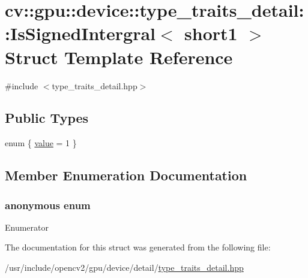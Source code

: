 \hypertarget{structcv_1_1gpu_1_1device_1_1type__traits__detail_1_1IsSignedIntergral_3_01short1_01_4}{\section{cv\-:\-:gpu\-:\-:device\-:\-:type\-\_\-traits\-\_\-detail\-:\-:Is\-Signed\-Intergral$<$ short1 $>$ Struct Template Reference}
\label{structcv_1_1gpu_1_1device_1_1type__traits__detail_1_1IsSignedIntergral_3_01short1_01_4}
}


{\ttfamily \#include $<$type\-\_\-traits\-\_\-detail.\-hpp$>$}

\subsection*{Public Types}
\begin{DoxyCompactItemize}
\item 
enum \{ \hyperlink{structcv_1_1gpu_1_1device_1_1type__traits__detail_1_1IsSignedIntergral_3_01short1_01_4_a915a71a38a582f613da7e56923549408a50918a03e2f43599201b97a733302d57}{value} = 1
 \}
\end{DoxyCompactItemize}


\subsection{Member Enumeration Documentation}
\hypertarget{structcv_1_1gpu_1_1device_1_1type__traits__detail_1_1IsSignedIntergral_3_01short1_01_4_a915a71a38a582f613da7e56923549408}{\subsubsection[{anonymous enum}]{\setlength{\rightskip}{0pt plus 5cm}anonymous enum}}\label{structcv_1_1gpu_1_1device_1_1type__traits__detail_1_1IsSignedIntergral_3_01short1_01_4_a915a71a38a582f613da7e56923549408}
\begin{Desc}
\item[Enumerator]\par
\begin{description}
\item[{\em 
\hypertarget{structcv_1_1gpu_1_1device_1_1type__traits__detail_1_1IsSignedIntergral_3_01short1_01_4_a915a71a38a582f613da7e56923549408a50918a03e2f43599201b97a733302d57}{value}\label{structcv_1_1gpu_1_1device_1_1type__traits__detail_1_1IsSignedIntergral_3_01short1_01_4_a915a71a38a582f613da7e56923549408a50918a03e2f43599201b97a733302d57}
}]\end{description}
\end{Desc}


The documentation for this struct was generated from the following file\-:\begin{DoxyCompactItemize}
\item 
/usr/include/opencv2/gpu/device/detail/\hyperlink{type__traits__detail_8hpp}{type\-\_\-traits\-\_\-detail.\-hpp}\end{DoxyCompactItemize}
